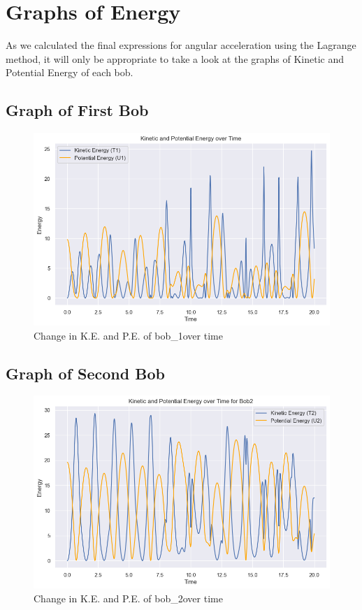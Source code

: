 \documentclass{article}
\begin{document}
\newpage
\section{Graphs of Energy}
As we calculated the final expressions for angular acceleration using the Lagrange method, it will only be appropriate to take a look at the graphs of Kinetic and Potential Energy of each bob.
\subsection{Graph of First Bob}
\begin{figure}[h]
    \centering
    \includegraphics[width=0.8\linewidth]{bob1.png}
    \caption{Change in K.E. and P.E. of bob_{1}\;over time}
\end{figure}
\subsection{Graph of Second Bob}
\begin{figure}[h]
    \centering
    \includegraphics[width=0.8\linewidth]{bob2.png}
    \caption{Change in K.E. and P.E. of bob_{2}\;over time}
\end{figure}
\end{document}
